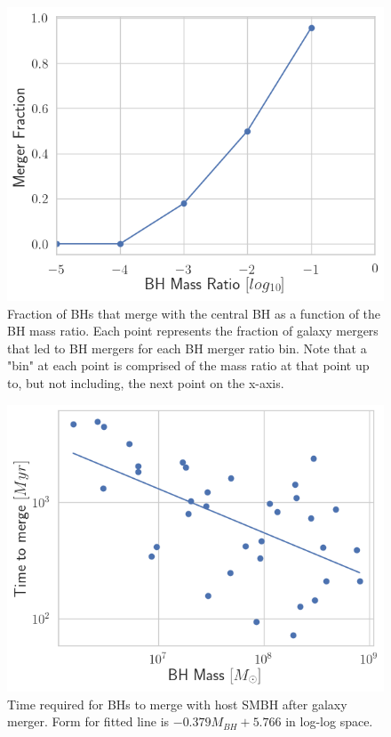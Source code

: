 \documentclass[fleqn,usenatbib,useAMS]{mnras}
\begin{document}
\begin{figure}
\begin{center}
\includegraphics[width=1.0\columnwidth]{plots/q_merger_fraction.png}
\caption{Fraction of BHs that merge with the central BH as a function of the BH mass ratio.  Each point represents the fraction of galaxy mergers that led to BH mergers for each BH merger ratio bin.  Note that a "bin" at each point is comprised of the mass ratio at that point up to, but not including, the next point on the x-axis.}
\label{fig:q_merge_fraction}
\end{center}
\end{figure}

\begin{figure}
\begin{center}
\includegraphics[width=1.0\columnwidth]{plots/time_to_merge.png}
\caption{Time required for BHs to merge with host SMBH after galaxy merger.  Form for fitted line is $-0.379M_{BH}+5.766$ in log-log space.}
\label{fig:time_to_merge}
\end{center}
\end{figure}
\end{document}
